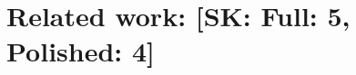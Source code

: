 \documentclass[conference]{IEEEtran}
\newcommand{\bottomlevel}[1]{\underline{l}_{#1}} %
\newcommand{\skug}[1]{{\color{blue}[SK: #1]}}
\begin{document}
%
%
%
%
%
%


    \section{Related work: \skug{Full: 5, Polished: 4}}
\end{document}
